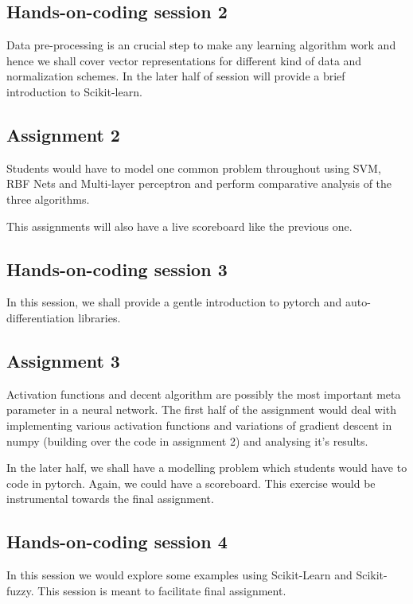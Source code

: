 \documentclass{article} %
\begin{document}
\subsection{Hands-on-coding session 2}

Data pre-processing is an crucial step to make any learning algorithm work
and hence we shall cover vector representations for different kind of data
and normalization schemes. In the later half of session will
provide a brief introduction to Scikit-learn. 

\subsection{Assignment 2}

Students would have to model one common problem throughout using SVM, RBF Nets and 
Multi-layer perceptron and perform comparative analysis of the three algorithms.

This assignments will also have a live scoreboard like the previous one.

\subsection{Hands-on-coding session 3}

In this session, we shall provide a gentle
introduction to pytorch and auto-differentiation libraries.

\subsection{Assignment 3}

Activation functions and decent algorithm are possibly the
most important meta parameter in a neural network. The first half of the
assignment would deal with implementing various activation functions
and variations of gradient descent in numpy (building over the code
in assignment 2) and analysing it's results.

In the later half, we shall have a modelling problem which students
would have to code in pytorch. Again, we could have a scoreboard.
This exercise would be instrumental towards the final assignment.


\subsection{Hands-on-coding session 4}

In this session we would explore some examples using
Scikit-Learn and Scikit-fuzzy. This session is meant to facilitate 
final assignment.
\end{document}
